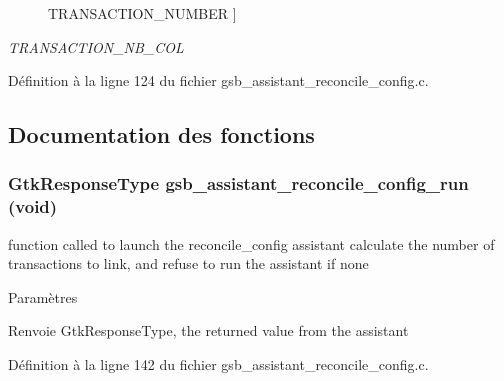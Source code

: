 \begin{Desc}
\begin{description}
{TRANSACTION\_\-NUMBER\label{gsb__assistant__reconcile__config_8c_a90c3e3851b339982e6bea71b6a9e9a61a7feac92da8f64c2dc680bfce62b6ee34}
}]\item[{\em 
TRANSACTION\_\-NB\_\-COL\label{gsb__assistant__reconcile__config_8c_a90c3e3851b339982e6bea71b6a9e9a61addd415207d8247b6f07d5c412cd82b6e}
}]\end{description}
\end{Desc}



Définition à la ligne 124 du fichier gsb\_\-assistant\_\-reconcile\_\-config.c.



\subsection{Documentation des fonctions}
\subsubsection[{gsb\_\-assistant\_\-reconcile\_\-config\_\-run}]{\setlength{\rightskip}{0pt plus 5cm}GtkResponseType gsb\_\-assistant\_\-reconcile\_\-config\_\-run (void)}\label{gsb__assistant__reconcile__config_8c_ac16081c512d6e40d5904ec9c62b668d4}
function called to launch the reconcile\_\-config assistant calculate the number of transactions to link, and refuse to run the assistant if none


\begin{DoxyParams}{Paramètres}
\item[{\em }]\end{DoxyParams}
\begin{DoxyReturn}{Renvoie}
GtkResponseType, the returned value from the assistant 
\end{DoxyReturn}


Définition à la ligne 142 du fichier gsb\_\-assistant\_\-reconcile\_\-config.c.

